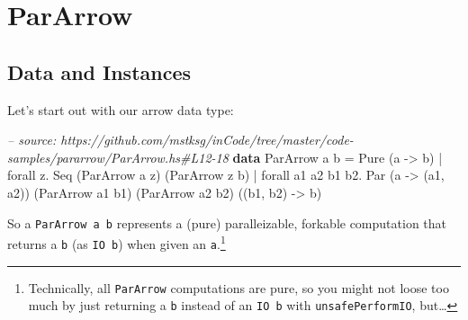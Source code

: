 \documentclass[]{article}
\newenvironment{Shaded}{}{}
\newcommand{\KeywordTok}[1]{\textcolor[rgb]{0.00,0.44,0.13}{\textbf{{#1}}}}
\newcommand{\DataTypeTok}[1]{\textcolor[rgb]{0.56,0.13,0.00}{{#1}}}
\newcommand{\CommentTok}[1]{\textcolor[rgb]{0.38,0.63,0.69}{\textit{{#1}}}}
\newcommand{\OtherTok}[1]{\textcolor[rgb]{0.00,0.44,0.13}{{#1}}}
\newcommand{\FunctionTok}[1]{\textcolor[rgb]{0.02,0.16,0.49}{{#1}}}
\newcommand{\NormalTok}[1]{{#1}}
\begin{document}
\section{ParArrow}\label{pararrow}

\subsection{Data and Instances}\label{data-and-instances}

Let's start out with our arrow data type:

\begin{Shaded}
\begin{Highlighting}[]
\CommentTok{-- source: https://github.com/mstksg/inCode/tree/master/code-samples/pararrow/ParArrow.hs#L12-18}
\KeywordTok{data} \DataTypeTok{ParArrow} \NormalTok{a b }\FunctionTok{=}                     \DataTypeTok{Pure}  \NormalTok{(a }\OtherTok{->} \NormalTok{b)}
                  \FunctionTok{|} \NormalTok{forall z}\FunctionTok{.}           \DataTypeTok{Seq}   \NormalTok{(}\DataTypeTok{ParArrow} \NormalTok{a z)}
                                              \NormalTok{(}\DataTypeTok{ParArrow} \NormalTok{z b)}
                  \FunctionTok{|} \NormalTok{forall a1 a2 b1 b2}\FunctionTok{.} \DataTypeTok{Par}   \NormalTok{(a }\OtherTok{->} \NormalTok{(a1, a2))}
                                              \NormalTok{(}\DataTypeTok{ParArrow} \NormalTok{a1 b1)}
                                              \NormalTok{(}\DataTypeTok{ParArrow} \NormalTok{a2 b2)}
                                              \NormalTok{((b1, b2) }\OtherTok{->} \NormalTok{b)}
\end{Highlighting}
\end{Shaded}

So a \texttt{ParArrow\ a\ b} represents a (pure) paralleizable, forkable
computation that returns a \texttt{b} (as \texttt{IO\ b}) when given an
\texttt{a}.\footnote{Technically, all \texttt{ParArrow} computations are pure,
  so you might not loose too much by just returning a \texttt{b} instead of an
  \texttt{IO\ b} with \texttt{unsafePerformIO}, but\ldots{}}
\end{document}
